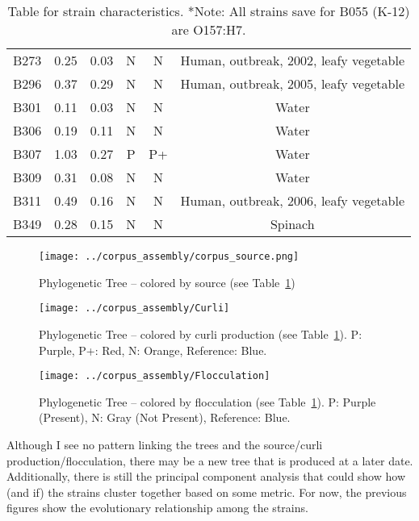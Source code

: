 \documentclass[11pt]{article}
\begin{document}
\begin{table}[h!]
\begin{tabular}{c|c|c|c|c|c}
B273 & 0.25 & 0.03 & N & N &   Human, outbreak, 2002, leafy vegetable        \\
B296 & 0.37 & 0.29 & N & N &   Human, outbreak, 2005, leafy vegetable        \\
B301 & 0.11 & 0.03 & N & N &   Water                                         \\
B306 & 0.19 & 0.11 & N & N &   Water                                         \\
B307 & 1.03 & 0.27 & P & P+ &  Water                                         \\
B309 & 0.31 & 0.08 & N & N &   Water                                         \\
B311 & 0.49 & 0.16 & N & N &   Human, outbreak, 2006, leafy vegetable        \\
B349 & 0.28 & 0.15 & N & N &   Spinach                                       \\
\hline
\end{tabular}
\caption{Table for strain characteristics. *Note: All strains save for B055 (K-12) are O157:H7.}
\label{demographics}
\end{table}


\begin{figure}[ht!]\normalsize %
\centering
\texttt{[image: ../corpus\_assembly/corpus\_source.png]}
\caption{Phylogenetic Tree -- colored by source (see Table~\ref{demographics})}
\label{source_tree}
\end{figure}
\clearpage

\begin{figure}[ht!]\normalsize %
\centering
\texttt{[image: ../corpus\_assembly/Curli]}
\caption{Phylogenetic Tree -- colored by curli production (see Table~\ref{demographics}). P: Purple, P+: Red, N: Orange, Reference: Blue.}
\label{curli_tree}
\end{figure}
\clearpage

\begin{figure}[ht!]\normalsize %
\centering
\texttt{[image: ../corpus\_assembly/Flocculation]}
\caption{Phylogenetic Tree -- colored by flocculation (see Table~\ref{demographics}). P: Purple (Present), N: Gray (Not Present), Reference: Blue.}
\label{flocculation_tree}
\end{figure}

Although I see no pattern linking the trees and the source/curli production/flocculation, there may be a new tree that is produced at a later date. Additionally, there is still the principal component analysis that could show how (and if) the strains cluster together based on some metric. For now, the previous figures show the evolutionary relationship among the strains.\\
\end{document}
